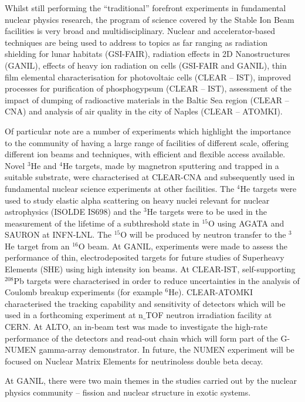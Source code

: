 Whilst still performing the “traditional” forefront experiments in fundamental nuclear physics research, the program of science covered by the Stable Ion Beam facilities is very broad and multidisciplinary. Nuclear and accelerator-based techniques are being used to address to topics as far ranging as radiation shielding for lunar habitats (GSI-FAIR), radiation effects in 2D Nanostructures (GANIL), effects of heavy ion radiation on cells (GSI-FAIR and GANIL), thin film elemental characterisation for photovoltaic cells (CLEAR – IST), improved processes for purification of phosphogypsum (CLEAR – IST), assessment of the impact of dumping of radioactive materials in the Baltic Sea region (CLEAR – CNA) and analysis of air quality in the city of Naples (CLEAR – ATOMKI).

Of particular note are a number of experiments which highlight the importance to the community of having a large range of facilities of different scale, offering different ion beams and techniques, with efficient and flexible access available. Novel $^3$He and $^4$He targets, made by magnetron sputtering and trapped in a suitable substrate, were characterised at CLEAR-CNA and subsequently used in fundamental nuclear science experiments at other facilities. The $^4$He targets were used to study elastic alpha scattering on heavy nuclei relevant for nuclear astrophysics (ISOLDE IS698) and the $^3$He targets were to be used in the measurement of the lifetime of a subthreshold state in $^{15}$O using AGATA and SAURON at INFN-LNL. The $^{15}$O will be produced by neutron transfer to the $^3$He target from an $^{16}$O beam. At GANIL, experiments were made to assess the performance of thin, electrodeposited targets for future studies of Superheavy Elements (SHE) using high intensity ion beams. At CLEAR-IST, self-supporting $^{208}$Pb targets were characterised in order to reduce uncertainties in the analysis of Coulomb breakup experiments (for example $^6$He). CLEAR-ATOMKI characterised the tracking capability and sensitivity of detectors which will be used in a forthcoming experiment at n$\_$TOF neutron irradiation facility at CERN. At ALTO, an in-beam test was made to investigate the high-rate performance of the detectors and read-out chain which will form part of the G-NUMEN gamma-array demonstrator. In future, the NUMEN experiment will be focused on Nuclear Matrix Elements for neutrinoless double beta decay. 

At GANIL, there were two main themes in the studies carried out by the nuclear physics community – fission and nuclear structure in exotic systems. 

